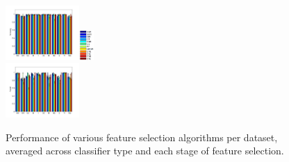 \begin{figure}[tbp!]
\centering
\includegraphics[width=0.25\textwidth]{./figures/dataset_perf/Accuracy.pdf}\includegraphics[width=0.05\textwidth]{./figures/dataset_perf/legend.PNG}\\
\includegraphics[width=0.25\textwidth]{./figures/dataset_perf/Recall.pdf}
\caption{\footnotesize Performance of various feature selection algorithms per dataset, averaged across classifier type and each stage of feature selection.}
\label{fig:perf_vs_dataset}
\end{figure}

